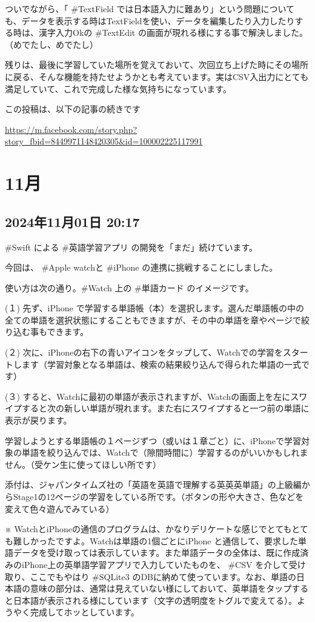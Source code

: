 ついでながら、「 \#TextField では日本語入力に難あり」という問題についても、データを表示する時はTextFieldを使い、データを編集したり入力したりする時は、漢字入力Okの \#TextEdit の画面が現れる様にする事で解決しました。（めでたし、めでたし）

残りは、最後に学習していた場所を覚えておいて、次回立ち上げた時にその場所に戻る、そんな機能を持たせようかとも考えています。実はCSV入出力にとても満足していて、これで完成した様な気持ちになっています。

この投稿は、以下の記事の続きです

\url{https://m.facebook.com/story.php?story_fbid=8449971148420305&id=100002225117991}

\section{11月}

\subsection*{2024年11月01日 20:17}

\#Swift による \#英語学習アプリ の開発を「まだ」続けています。

今回は、 \#Apple watchと \#iPhone の連携に挑戦することにしました。

使い方は次の通り。\#Watch 上の \#単語カード のイメージです。

(１) 先ず、iPhone で学習する単語帳（本）を選択します。選んだ単語帳の中の全ての単語を選択状態にすることもできますが、その中の単語を章やページで絞り込む事もできます。

(２) 次に、iPhoneの右下の青いアイコンをタップして、Watchでの学習をスタートします（学習対象となる単語は、検索の結果絞り込んで得られた単語の一式です）

(３) すると、Watchに最初の単語が表示されますが、Watchの画面上を左にスワイプすると次の新しい単語が現れます。また右にスワイプすると一つ前の単語に表示が戻ります。

学習しようとする単語帳の１ページずつ（或いは１章ごと）に、iPhoneで学習対象の単語を絞り込んでは、Watchで（隙間時間に）学習するのがいいかもしれません。（受ケン生に使ってほしい所です）

添付は、ジャパンタイムズ社の「英語を英語で理解する英英英単語」の上級編からStage1の12ページの学習をしている所です。（ボタンの形や大きさ、色などを変えて色々遊んでみている）

※ WatchとiPhoneの通信のプログラムは、かなりデリケートな感じでとてもとても難しかったですよ。Watchは単語の1個ごとにiPhone と通信して、要求した単語データを受け取っては表示しています。また単語データの全体は、既に作成済みのiPhone上の英単語学習アプリで入力していたものを、 \#CSV を介して受け取り、ここでもやはり \#SQLite3 のDBに納めて使っています。なお、単語の日本語の意味の部分は、通常は見えていない様にしておいて、英単語をタップすると日本語が表示される様にしています（文字の透明度をトグルで変えてる）。ようやく完成してホッとしています。

